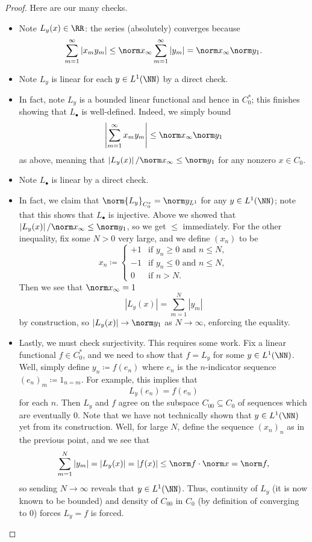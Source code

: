 \documentclass[../notes.tex]{subfiles}
\begin{document}
\begin{proof}
	Here are our many checks.
	\begin{itemize}
		\item Note $L_y(x)\in\RR$: the series (absolutely) converges because
		\[\sum_{m=1}^\infty\left|x_my_m\right|\le\norm x_\infty\sum_{m=1}^\infty\left|y_m\right|=\norm x_\infty\norm y_1.\]
		\item Note $L_y$ is linear for each $y\in L^1(\NN)$ by a direct check.
		\item In fact, note $L_y$ is a bounded linear functional and hence in $C_0^*$; this finishes showing that $L_\bullet$ is well-defined. Indeed, we simply bound
		\[\left|\sum_{m=1}^\infty x_my_m\right|\le\norm x_\infty\norm y_1\]
		as above, meaning that $\left|L_y(x)\right|/\norm x_\infty\le\norm y_1$ for any nonzero $x\in C_0$.
		\item Note $L_\bullet$ is linear by a direct check.
		\item In fact, we claim that $\norm{L_y}_{C_0^*}=\norm y_{L^1}$ for any $y\in L^1(\NN)$; note that this shows that $L_\bullet$ is injective. Above we showed that $\left|L_y(x)\right|/\norm x_\infty\le\norm y_1$, so we get $\le$ immediately. For the other inequality, fix some $N>0$ very large, and we define $(x_n)$ to be
		\[x_n\coloneqq\begin{cases}
			+1 & \text{if }y_n\ge0\text{ and }n\le N, \\
			-1 & \text{if }y_n\le0\text{ and }n\le N, \\
			0 & \text{if }n>N.
		\end{cases}\]
		Then we see that $\norm x_\infty=1$
		\[\left|L_y(x)\right|=\sum_{m=1}^N\left|y_m\right|\]
		by construction, so $\left|L_y(x)\right|\to\norm y_1$ as $N\to\infty$, enforcing the equality.
		\item Lastly, we must check surjectivity. This requires some work. Fix a linear functional $f\in C_0^*$, and we need to show that $f=L_y$ for some $y\in L^1(\NN)$. Well, simply define $y_n\coloneqq f(e_n)$ where $e_n$ is the $n$-indicator sequence $(e_n)_m\coloneqq1_{n=m}$. For example, this implies that
		\[L_y(e_n)=f(e_n)\]
		for each $n$. Then $L_y$ and $f$ agree on the subspace $C_{00}\subseteq C_0$ of sequences which are eventually $0$. Note that we have not technically shown that $y\in L^1(\NN)$ yet from its construction. Well, for large $N$, define the sequence $(x_n)_n$ as in the previous point, and we see that
		\[\sum_{m=1}^N\left|y_m\right|=\left|L_y(x)\right|=\left|f(x)\right|\le\norm f\cdot\norm x=\norm f,\]
		so sending $N\to\infty$ reveals that $y\in L^1(\NN)$. Thus, continuity of $L_y$ (it is now known to be bounded) and density of $C_{00}$ in $C_0$ (by definition of converging to $0$) forces $L_y=f$ is forced.
		\qedhere
	\end{itemize}
\end{proof}
\end{document}
